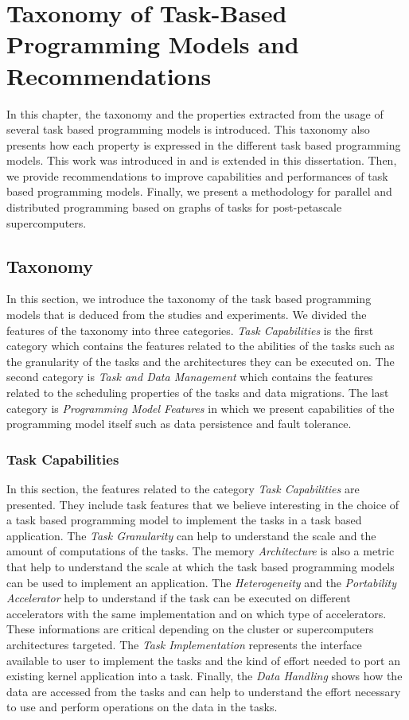 \chapter{Taxonomy of Task-Based Programming Models and Recommendations}
\label{chap:taxonomy}

In this chapter, the taxonomy and the properties extracted from the usage of several task based programming models is introduced.
This taxonomy also presents how each property is expressed in the different task based programming models.
This work was introduced in \cite{PetGC2020} and is extended in this dissertation.
Then, we provide recommendations to improve capabilities and performances of task based programming models.
Finally, we present a methodology for parallel and distributed programming based on graphs of tasks for post-petascale supercomputers.

\section{Taxonomy}
In this section, we introduce the taxonomy of the task based programming models that is deduced from the studies and experiments.
We divided the features of the taxonomy into three categories.
\textit{Task Capabilities} is the first category which contains the features related to the abilities of the tasks such as the granularity of the tasks and the architectures they can be executed on.
The second category is \textit{Task and Data Management} which contains the features related to the scheduling properties of the tasks and data migrations.
The last category is \textit{Programming Model Features} in which we present capabilities of the programming model itself such as data persistence and fault tolerance.


\subsection{Task Capabilities}
In this section, the features related to the category \textit{Task Capabilities} are presented.
They include task features that we believe interesting in the choice of a task based programming model to implement the tasks in a task based application.
The \textit{Task Granularity} can help to understand the scale and the amount of computations of the tasks.
The memory \textit{Architecture} is also a metric that help to understand the scale at which the task based programming models can be used to implement an application.
The \textit{Heterogeneity} and the \textit{Portability Accelerator} help to understand if the task can be executed on different accelerators with the same implementation and on which type of accelerators.
These informations are critical depending on the cluster or supercomputers architectures targeted.
The \textit{Task Implementation} represents the interface available to user to implement the tasks and the kind of effort needed to port an existing kernel application into a task.
Finally, the \textit{Data Handling} shows how the data are accessed from the tasks and can help to understand the effort necessary to use and perform operations on the data in the tasks.

